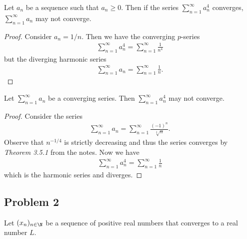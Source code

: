 \documentclass{article}
\begin{document}
\begin{claim}
	Let $a_n$ be a sequence such that $a_n\geq 0$. Then if the series
	$\sum_{n=1}^\infty a_n^4$ converges, $\sum_{n=1}^\infty a_n$ may
	not converge.
\end{claim}

\begin{proof}
	Consider $a_n = 1/n$. Then we have the converging $p$-series
	\begin{align*}
		\sum_{n=1}^\infty a_n^4 = \sum_{n=1}^\infty \frac{1}{n^4}
	\end{align*}
	but the diverging harmonic series
	\begin{align*}
		\sum_{n=1}^\infty a_n = \sum_{n=1}^\infty \frac{1}{n}.
	\end{align*}
\end{proof}

\begin{claim}
	Let $\sum_{n=1}^\infty a_n$ be a converging series. Then
	$\sum_{n=1}^\infty a_n^4$ may not converge.
\end{claim}

\begin{proof}
	Consider the series
	\begin{align*}
		\sum_{n=1}^\infty a_n = \sum_{n=1}^\infty \frac{(-1)^n}{\sqrt[4]{n}}.
	\end{align*}
	Observe that $n^{-1/4}$ is strictly decreasing and thus the series converges
	by \emph{Theorem 3.5.1} from the notes. Now we have
	\begin{align*}
		\sum_{n=1}^\infty a_n^4 = \sum_{n=1}^\infty \frac{1}{n}
	\end{align*}
	which is the harmonic series and diverges.
\end{proof}

\subsection*{Problem 2}

Let $(x_n)_{n\in\N}$ be a sequence of positive real
numbers that converges to a real number $L$.
\end{document}
